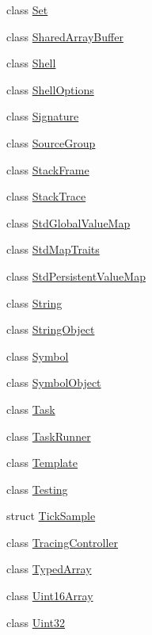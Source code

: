\begin{DoxyCompactItemize}
\item 
class \mbox{\hyperlink{classv8_1_1Set}{Set}}
\item 
class \mbox{\hyperlink{classv8_1_1SharedArrayBuffer}{Shared\+Array\+Buffer}}
\item 
class \mbox{\hyperlink{classv8_1_1Shell}{Shell}}
\item 
class \mbox{\hyperlink{classv8_1_1ShellOptions}{Shell\+Options}}
\item 
class \mbox{\hyperlink{classv8_1_1Signature}{Signature}}
\item 
class \mbox{\hyperlink{classv8_1_1SourceGroup}{Source\+Group}}
\item 
class \mbox{\hyperlink{classv8_1_1StackFrame}{Stack\+Frame}}
\item 
class \mbox{\hyperlink{classv8_1_1StackTrace}{Stack\+Trace}}
\item 
class \mbox{\hyperlink{classv8_1_1StdGlobalValueMap}{Std\+Global\+Value\+Map}}
\item 
class \mbox{\hyperlink{classv8_1_1StdMapTraits}{Std\+Map\+Traits}}
\item 
class \mbox{\hyperlink{classv8_1_1StdPersistentValueMap}{Std\+Persistent\+Value\+Map}}
\item 
class \mbox{\hyperlink{classv8_1_1String}{String}}
\item 
class \mbox{\hyperlink{classv8_1_1StringObject}{String\+Object}}
\item 
class \mbox{\hyperlink{classv8_1_1Symbol}{Symbol}}
\item 
class \mbox{\hyperlink{classv8_1_1SymbolObject}{Symbol\+Object}}
\item 
class \mbox{\hyperlink{classv8_1_1Task}{Task}}
\item 
class \mbox{\hyperlink{classv8_1_1TaskRunner}{Task\+Runner}}
\item 
class \mbox{\hyperlink{classv8_1_1Template}{Template}}
\item 
class \mbox{\hyperlink{classv8_1_1Testing}{Testing}}
\item 
struct \mbox{\hyperlink{structv8_1_1TickSample}{Tick\+Sample}}
\item 
class \mbox{\hyperlink{classv8_1_1TracingController}{Tracing\+Controller}}
\item 
class \mbox{\hyperlink{classv8_1_1TypedArray}{Typed\+Array}}
\item 
class \mbox{\hyperlink{classv8_1_1Uint16Array}{Uint16\+Array}}
\item 
class \mbox{\hyperlink{classv8_1_1Uint32}{Uint32}}

\end{DoxyCompactItemize}
